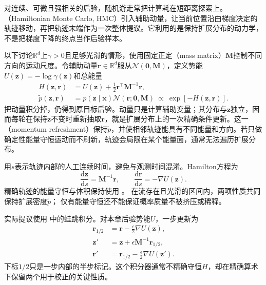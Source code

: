 对连续、可微且强相关的后验，随机游走常把计算耗在短距离探索上。（Hamiltonian Monte Carlo, HMC）引入辅助动量，让当前位置沿由梯度决定的轨迹移动，再把轨迹末端作为一次整体提议。它利用的是保持扩展分布的动力学，不是把梯度下降的终点当作后验样本。

以下讨论$\mathbb{R}^{d}$上$\gamma>0$且足够光滑的情形，使用固定正定（mass matrix）$\bm{M}$控制不同方向的运动尺度。令辅助动量$\bm{r}\in\mathbb{R}^{d}$服从$\mathcal{N}(\bm{0},\bm{M})$，定义势能$U(\bm{z})=-\log\gamma(\bm{z})$和总能量
\begin{equation}
  \begin{aligned}
    H(\bm{z},\bm{r})&=U(\bm{z})+\frac12\bm{r}^{\top}\bm{M}^{-1}\bm{r},\\
    \widetilde p(\bm{z},\bm{r})
      &=p(\bm{z}\mid\bm{x})\mathcal{N}(\bm{r};\bm{0},\bm{M})
        \ \propto\ \exp[-H(\bm{z},\bm{r})].
  \end{aligned}
  \label{eq:pgm-sampling-hamiltonian}
\end{equation}
把动量积分掉，仍得到原目标后验。动量只是计算辅助变量；其分布与$\bm{z}$独立，因而每轮在保持$\bm{z}$不变时重新抽取$\bm{r}$，就是扩展分布上的一次精确条件更新。这一（momentum refreshment）保持$\widetilde p$，并使相邻轨迹能具有不同能量和方向。若只做确定性能量守恒运动而不刷新，轨迹会局限在某个能量面，通常无法遍历扩展分布。

用$s$表示轨迹内部的人工连续时间，避免与观测时间混淆。Hamilton方程为
\begin{equation}
  \frac{\mathrm{d}\bm{z}}{\mathrm{d}s}=\bm{M}^{-1}\bm{r},
  \qquad
  \frac{\mathrm{d}\bm{r}}{\mathrm{d}s}=-\nabla U(\bm{z}).
  \label{eq:pgm-sampling-hamilton-equations}
\end{equation}
精确轨迹的能量守恒与体积保持使用
。
在流存在且光滑的区间内，两项性质共同保持扩展密度$\widetilde p$；
仅有能量守恒还不能保证概率质量不被挤压或稀释。

实际提议使用
中的蛙跳积分。对本章后验势能$U$，一步更新为
\begin{equation}
  \begin{aligned}
    \bm{r}_{1/2}&=\bm{r}-\frac{\epsilon}{2}\nabla U(\bm{z}),\\
    \bm{z}'&=\bm{z}+\epsilon\bm{M}^{-1}\bm{r}_{1/2},\\
    \bm{r}'&=\bm{r}_{1/2}-\frac{\epsilon}{2}\nabla U(\bm{z}').
  \end{aligned}
  \label{eq:pgm-sampling-leapfrog}
\end{equation}
下标$1/2$只是一步内部的半步标记。这个积分器通常不精确守恒$H$，却在精确算术下保留两个用于校正的关键性质。

